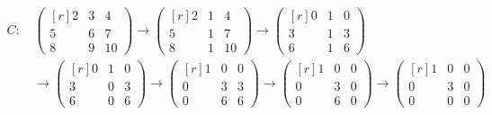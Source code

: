 \documentclass[a4paper,10pt,numbers=noenddot]{scrartcl}
\begin{document}
\begin{align*}
  C:
  &\,
  \begin{pmatrix*}[r]
    2 & 3 &  4  \\
    5 & 6 &  7  \\
    8 & 9 & 10
  \end{pmatrix*}
  \to
  \begin{pmatrix*}[r]
    2 & 1 &  4  \\
    5 & 1 &  7  \\
    8 & 1 & 10
  \end{pmatrix*}
  \to
  \begin{pmatrix*}[r]
    0 & 1 & 0 \\
    3 & 1 & 3 \\
    6 & 1 & 6
  \end{pmatrix*}
  \\
  &\,
  \to
  \begin{pmatrix*}[r]
    0 & 1 & 0 \\
    3 & 0 & 3 \\
    6 & 0 & 6
  \end{pmatrix*}
  \to
  \begin{pmatrix*}[r]
    1 & 0 & 0 \\
    0 & 3 & 3 \\
    0 & 6 & 6
  \end{pmatrix*}
  \to
  \begin{pmatrix*}[r]
    1 & 0 & 0 \\
    0 & 3 & 0 \\
    0 & 6 & 0
  \end{pmatrix*}
  \to
  \begin{pmatrix*}[r]
    1 & 0 & 0 \\
    0 & 3 & 0 \\
    0 & 0 & 0
  \end{pmatrix*}
\end{align*}
\end{document}
